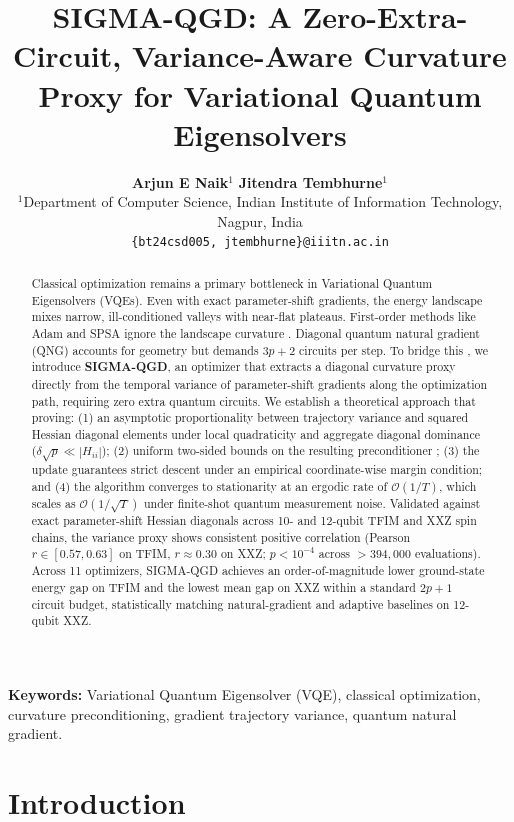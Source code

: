 \documentclass[11pt,a4paper]{article}
\title{\textbf{SIGMA-QGD: A Zero-Extra-Circuit, Variance-Aware Curvature Proxy for Variational Quantum Eigensolvers}}
\author{
    \textbf{Arjun E Naik}$^{1}$ \quad \textbf{Jitendra Tembhurne}$^{1}$ \\[1ex]
    $^{1}$Department of Computer Science, Indian Institute of Information Technology, Nagpur, India \\
    \texttt{\{bt24csd005, jtembhurne\}@iiitn.ac.in}
}
\date{}
\begin{document}
\maketitle

\begin{abstract}
Classical optimization remains a primary bottleneck in Variational Quantum Eigensolvers (VQEs). Even with exact  parameter-shift gradients, the energy landscape mixes narrow, ill-conditioned valleys with near-flat plateaus. First-order methods like Adam and SPSA ignore the  landscape curvature . Diagonal quantum natural gradient (QNG) accounts for geometry but demands $3p+2$ circuits per step. To bridge this , we introduce \textbf{SIGMA-QGD}, an optimizer that extracts a diagonal curvature proxy directly from the temporal variance of parameter-shift gradients along the optimization path, requiring zero extra quantum circuits. We establish a theoretical approach that proving: (1) an asymptotic proportionality between trajectory variance and squared Hessian diagonal elements under local quadraticity and aggregate diagonal dominance ($\delta\sqrt{p} \ll |H_{ii}|$); (2) uniform two-sided bounds on the resulting preconditioner ; (3) the update guarantees strict descent under an empirical coordinate-wise margin condition; and (4) the algorithm converges to stationarity at an ergodic rate of $\mathcal{O}(1/T)$, which scales as  $\mathcal{O}(1/\sqrt{T})$ under finite-shot quantum measurement noise. Validated against exact parameter-shift Hessian diagonals across 10- and 12-qubit TFIM and XXZ spin chains, the variance proxy shows consistent positive correlation (Pearson $r \in [0.57, 0.63]$ on TFIM, $r \approx 0.30$ on XXZ; $p < 10^{-4}$ across $>394{,}000$ evaluations). Across 11 optimizers, SIGMA-QGD achieves an order-of-magnitude lower ground-state energy gap on TFIM and the lowest mean gap on XXZ within a standard $2p+1$ circuit budget, statistically matching natural-gradient and adaptive baselines on 12-qubit XXZ.
\end{abstract}

\textbf{Keywords:} Variational Quantum Eigensolver (VQE), classical optimization, curvature preconditioning, gradient trajectory variance, quantum natural gradient.

\newpage

\section{Introduction}
\label{sec:intro}
\end{document}
